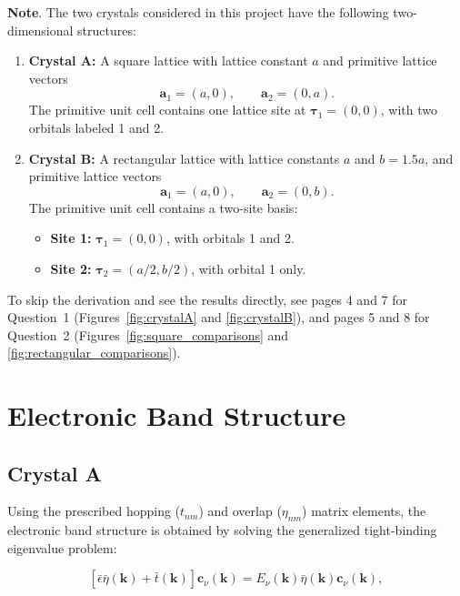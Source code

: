 \documentclass[11pt]{article}
\begin{document}
\textbf{Note}. The two crystals considered in this project have the following two-dimensional structures:

\begin{enumerate}
    \item \textbf{Crystal A:} A square lattice with lattice constant $a$ and primitive lattice vectors
    \[
    \mathbf{a}_1 = (a,0), \qquad \mathbf{a}_2 = (0,a).
    \]
    The primitive unit cell contains one lattice site at $\boldsymbol{\tau}_1=(0,0)$, with two orbitals labeled 1 and 2.

    \item \textbf{Crystal B:} A rectangular lattice with lattice constants $a$ and $b=1.5a$, and primitive lattice vectors
    \[
    \mathbf{a}_1=(a,0), \qquad \mathbf{a}_2=(0,b).
    \]
    The primitive unit cell contains a two-site basis:
    \begin{itemize}
        \item \textbf{Site 1:} $\boldsymbol{\tau}_1=(0,0)$, with orbitals 1 and 2.
        \item \textbf{Site 2:} $\boldsymbol{\tau}_2=(a/2,b/2)$, with orbital 1 only.
    \end{itemize}
    
\end{enumerate}

To skip the derivation and see the results directly, see pages 4 and 7 for Question~1 (Figures~\ref{fig:crystalA} and \ref{fig:crystalB}), and pages 5 and 8 for Question~2 (Figures~\ref{fig:square_comparisons} and \ref{fig:rectangular_comparisons}).

\section{Electronic Band Structure}

\subsection{Crystal A}
Using the prescribed hopping ($t_{nm}$) and overlap ($\eta_{nm}$) matrix elements, the electronic band structure is obtained by solving the generalized tight-binding eigenvalue problem:

\begin{equation}
\label{eq:generaleq}
\left[
\bar{\epsilon}\bar{\eta}(\mathbf{k})
+
\bar{t}(\mathbf{k})
\right]
\mathbf{c}_{\nu}(\mathbf{k})
=
E_{\nu}(\mathbf{k})
\bar{\eta}(\mathbf{k})
\mathbf{c}_{\nu}(\mathbf{k}),
\end{equation}
\end{document}
